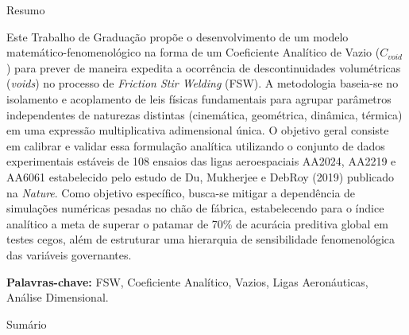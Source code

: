 \documentclass[12pt,openany]{report}
\begin{document}
\newpage

\thispagestyle{empty}
\vspace*{2.5cm} 

\begin{center}
    {\selectfont\Huge Resumo\par} 
\end{center}

\vspace{1.8cm} 

Este Trabalho de Graduação propõe o desenvolvimento de um modelo matemático-fenomenológico na forma de um Coeficiente Analítico de Vazio ($C_{void}$) para prever de maneira expedita a ocorrência de descontinuidades volumétricas (\textit{voids}) no processo de \textit{Friction Stir Welding} (FSW). A metodologia baseia-se no isolamento e acoplamento de leis físicas fundamentais para agrupar parâmetros independentes de naturezas distintas (cinemática, geométrica, dinâmica, térmica) em uma expressão multiplicativa adimensional única. O objetivo geral consiste em calibrar e validar essa formulação analítica utilizando o conjunto de dados experimentais estáveis de 108 ensaios das ligas aeroespaciais AA2024, AA2219 e AA6061 estabelecido pelo estudo de Du, Mukherjee e DebRoy (2019) publicado na \textit{Nature}. Como objetivo específico, busca-se mitigar a dependência de simulações numéricas pesadas no chão de fábrica, estabelecendo para o índice analítico a meta de superar o patamar de 70\% de acurácia preditiva global em testes cegos, além de estruturar uma hierarquia de sensibilidade fenomenológica das variáveis governantes.

\vspace{1.0cm}
\noindent \textbf{Palavras-chave:} FSW, Coeficiente Analítico, Vazios, Ligas Aeronáuticas, Análise Dimensional.

\newpage

\thispagestyle{empty}
\begin{center}
    {\selectfont\Huge Sumário\par}
\end{center}
\vspace{1.5cm}
\end{document}
